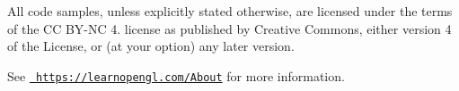 All code samples, unless explicitly stated otherwise, are licensed under the terms of the CC B\+Y-\/\+NC 4. license as published by Creative Commons, either version 4 of the License, or (at your option) any later version.

See \href{https://learnopengl.com/About}{\texttt{ https\+://learnopengl.\+com/\+About}} for more information. 